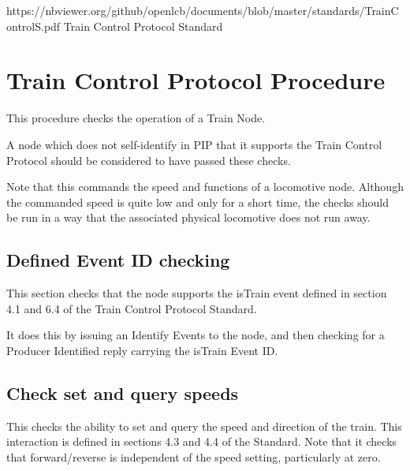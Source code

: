 



\maketitle
\thispagestyle{firststyle}

\introductionCaveats
    {https://nbviewer.org/github/openlcb/documents/blob/master/standards/TrainControlS.pdf}
    {Train Control Protocol Standard}

\section{Train Control Protocol Procedure}


This procedure checks the operation of a Train Node.  

A node which does not self-identify in PIP that it supports
the Train Control Protocol should be considered to have passed these checks.
\pipsetFootnote

Note that this commands the speed and functions of a locomotive node.
Although the commanded speed is quite low and only for a short time, the
checks should be run in a way that the associated physical locomotive
does not run away.

\subsection{Defined Event ID checking}

This section checks that the node supports the isTrain event
defined in section 4.1 and 6.4 of the Train Control Protocol Standard.

It does this by issuing an Identify Events to the node, and then
checking for a Producer Identified reply carrying the isTrain Event ID.

\subsection{Check set and query speeds}

This checks the ability to set and query the speed and direction of the train.
This interaction is defined in sections 4.3 and 4.4 of the Standard.
Note that it checks that forward/reverse is independent of the speed setting, particularly
at zero.

